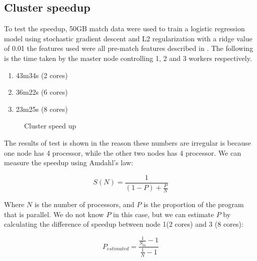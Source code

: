 \subsection{Cluster speedup}\label{sec:speedup}
To test the speedup, 50GB match data were used to train a logistic regression model using stochastic gradient descent and L2 regularization with a ridge value of 0.01 the features used were all pre-match features described in . The following is the time taken by the master node controlling 1, 2 and 3 workers respectively.

\begin{enumerate}
    \item 43m34s (2 cores)
    \item 36m22s (6 cores)
    \item 23m25s (8 cores)
\end{enumerate}

\begin{figure}[!htb]
  \centering
   \caption{Cluster speed up}\label{fig:cluster-speedup}
\end{figure}
The results of test is shown in  the reason these numbers are irregular is because one node has 4 processor, while the other two nodes has 4 processor. We can measure the speedup using Amdahl's law:

\[S(N) = \frac{1}{(1-P)+\frac{P}{N}}\]

Where $N$ is the number of processors, and $P$ is the proportion of the program that is parallel. We do not know $P$ in this case, but we can estimate $P$ by calculating the difference of speedup between node 1(2 cores) and 3 (8 cores):

\[P_{estimated} = \frac{\frac{1}{S_m}-1}{\frac{1}{N}-1}  \]

